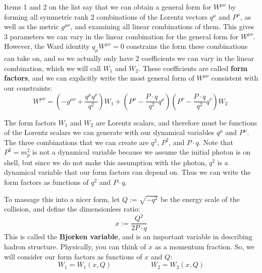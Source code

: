 \documentclass[11pt, oneside]{article}   	%
\theoremstyle{definition}
\begin{document}
Items 1 and 2 on the list say that we can obtain a general form for $W^{\mu\nu}$ by forming all symmetric rank 2 combinations 
of the Lorentz vectors $q^\mu$ and $P^\mu$, as well as the metric $g^{\mu\nu}$, and examining all linear combinations of 
them. This gives 3 parameters we can vary in the linear combination for the general form for $W^{\mu\nu}$. 
However, the Ward identity $q_\mu W^{\mu\nu} = 0$ constrains the form these combinations can take on, and so we actually 
only have 2 coefficients we can vary in the linear combination, which we will call $W_1$ and $W_2$. These coefficients are called 
\textbf{form factors}, and we can explicitly write the most general form of $W^{\mu\nu}$ consistent with our constraints:
\begin{equation}
	W^{\mu\nu} = \left(-g^{\mu\nu} + \frac{q^\mu q^\nu}{q^2}\right) W_1 + \left(P^\mu - \frac{P\cdot q}{q^2}q^\mu\right)\left(P^\nu - 
	\frac{P\cdot q}{q^2}q^\nu\right) W_2~
	\label{eq:form_factors}
\end{equation}

The form factors $W_1$ and $W_2$ are Lorentz scalars, and therefore must be functions of the Lorentz scalars we can generate with 
our dynamical variables $q^\mu$ and $P^\mu$. The three combinations that we can create are $q^2$, $P^2$, and $P\cdot q$. Note that 
$P^2 = m_p^2$ is not a dynamical variable because we assume the initial photon is on shell, but since we do not make this assumption 
with the photon, $q^2$ is a dynamical variable that our form factors can depend on. Thus we can write the form factors as functions 
of $q^2$ and $P\cdot q$. 

To massage this into a nicer form, let $Q := \sqrt{-q^2}$ be the energy scale of the collision, and define the dimensionless ratio:
\begin{equation}
	x := \frac{Q^2}{2 P\cdot q}
\end{equation}
This is called the \textbf{Bjorken variable}, and is an important variable in describing hadron structure. Physically, you can think of $x$ as a 
momentum fraction. So, we will consider our form factors as functions of $x$ and $Q$:
\begin{equation}
	W_1 = W_1(x, Q)\;\;\;\;\;\;\;\;\;\;\;\;\;\;\;\;\;\;\;\; W_2 = W_2(x, Q)
\end{equation}
\end{document}
